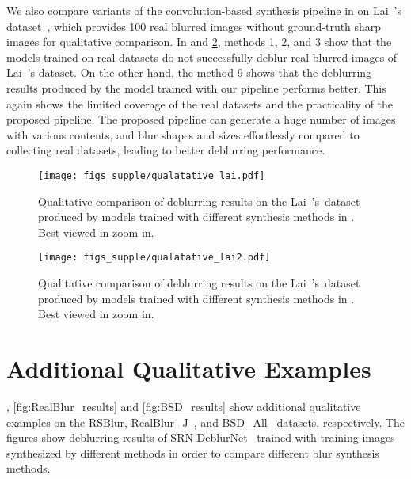 We also compare variants of the convolution-based synthesis pipeline in  on Lai~\etal's dataset~\cite{Lai-CVPR16}, which provides 100 real blurred images without ground-truth sharp images for qualitative comparison. 
In  and \ref{fig:qualitative_lai2}, methods 1, 2, and 3 show that the models trained on real datasets do not successfully deblur real blurred images of Lai~\etal's dataset. 
On the other hand, the method 9 shows that the deblurring results produced by the model trained with our pipeline performs better.
This again shows the limited coverage of the real datasets and the practicality of the proposed pipeline.
The proposed pipeline can generate a huge number of images with various contents, and blur shapes and sizes effortlessly compared to collecting real datasets, leading to better deblurring performance.


\begin{figure}[t]
\centering
\texttt{[image: figs\_supple/qualatative\_lai.pdf]}
\vspace{-0.8cm}
\caption{Qualitative comparison of deblurring results on the Lai~\etal's~dataset~\cite{Lai-CVPR16} produced by models trained with different synthesis methods in .
Best viewed in zoom in.
}
\label{fig:qualitative_lai}
\end{figure}

\begin{figure}[t]
\centering
\texttt{[image: figs\_supple/qualatative\_lai2.pdf]}
\vspace{-0.8cm}
\caption{Qualitative comparison of deblurring results on the Lai~\etal's~dataset~\cite{Lai-CVPR16} produced by models trained with different synthesis methods in .
Best viewed in zoom in.
}
\label{fig:qualitative_lai2}
\end{figure}


\section{Additional Qualitative Examples}

, \ref{fig:RealBlur_results} and \ref{fig:BSD_results} show additional qualitative examples on the RSBlur, RealBlur\_J~\cite{jsrim-ECCV2020}, and BSD\_All~\cite{Zhong_2020_ECCV,Zhong_2021_arxiv} datasets, respectively.
The figures show deblurring results of SRN-DeblurNet~\cite{Tao-CVPR18} trained with training images synthesized by different methods in order to compare different blur synthesis methods.


